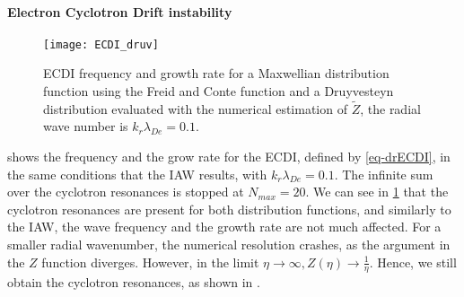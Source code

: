   \paragraph{Electron Cyclotron Drift instability\\}
    
    \begin{figure}[!hbt]
    \centering
    \texttt{[image: ECDI\_druv]}
    \caption{\acs{ECDI} frequency and growth rate for a Maxwellian distribution function using the Freid and Conte function and a Druyvesteyn distribution evaluated with the numerical estimation of $\tilde{Z}$, the radial wave number is $k_r \lambda_{De} = 0.1 $.}
    \label{fig-ECDI_druv}
  \end{figure}
  
   shows the frequency and the grow rate for the \ac{ECDI}, defined by \cref{eq-drECDI}, in the same conditions that the \ac{IAW} results, with $k_r \lambda_{De} = 0.1 $.
  The infinite sum over the cyclotron resonances is stopped at $N_{max} = 20$.
  We can see in \cref{fig-ECDI_druv} that the cyclotron resonances are present for both distribution functions, and similarly to the \ac{IAW}, the wave frequency and the growth rate are not much affected.
  For a smaller radial wavenumber, the numerical resolution crashes, as the argument in the $Z$ function diverges.
  However, in the limit $\eta \rightarrow \infty, Z(\eta) \rightarrow  \frac{1}{\eta}$.
  Hence, we still obtain the cyclotron resonances, as shown in \citet[Fig. 2]{janhunen2018}.
  
  
\let\rightmark=\oldrightmark
